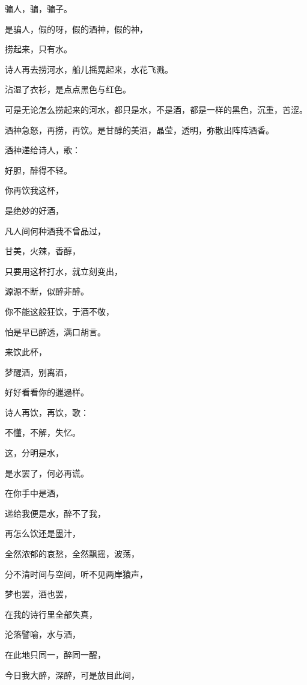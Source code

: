 \documentclass[UTF8]{article}
\begin{document}
\par 骗人，骗，骗子。
\par 是骗人，假的呀，假的酒神，假的神，
\par 捞起来，只有水。
\\[0.6cm]
\par 诗人再去捞河水，船儿摇晃起来，水花飞溅。
\par 沾湿了衣衫，是点点黑色与红色。
\par 可是无论怎么捞起来的河水，都只是水，不是酒，都是一样的黑色，沉重，苦涩。
\par 酒神急怒，再捞，再饮。是甘醇的美酒，晶莹，透明，弥散出阵阵酒香。
\\[0.6cm]
\par 酒神递给诗人，歌：
\\[0.6cm]
\par 好胆，醉得不轻。
\par 你再饮我这杯，
\par 是绝妙的好酒，
\par 凡人间何种酒我不曾品过，
\par 甘美，火辣，香醇，
\par 只要用这杯打水，就立刻变出，
\par 源源不断，似醉非醉。
\par 你不能这般狂饮，于酒不敬，
\par 怕是早已醉透，满口胡言。
\par 来饮此杯，
\par 梦醒酒，别离酒，
\par 好好看看你的邋遢样。
\\[0.6cm]
\par 诗人再饮，再饮，歌：
\\[0.6cm]
\par 不懂，不解，失忆。
\par 这，分明是水，
\par 是水罢了，何必再谎。
\par 在你手中是酒，
\par 递给我便是水，醉不了我，
\par 再怎么饮还是墨汁，
\par 全然浓郁的哀愁，全然飘摇，波荡，
\par 分不清时间与空间，听不见两岸猿声，
\par 梦也罢，酒也罢，
\par 在我的诗行里全部失真，
\par 沦落譬喻，水与酒，
\par 在此地只同一，醉同一醒，
\par 今日我大醉，深醉，可是放目此间，
\end{document}
